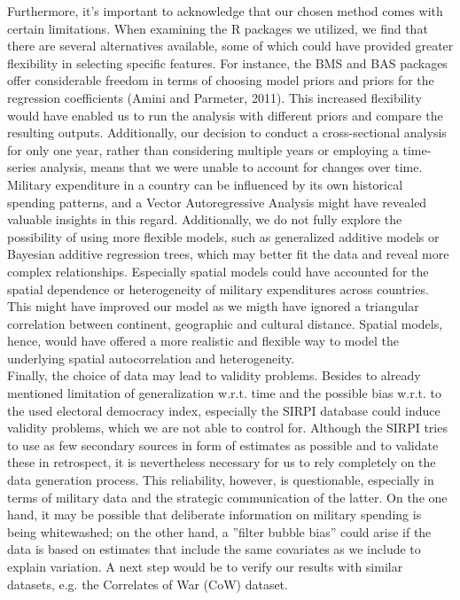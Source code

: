 \documentclass[12pt,a4paper]{article}
\begin{document}
Furthermore, it's important to acknowledge that our chosen method comes with certain limitations. When examining the R packages we utilized, we find that there are several alternatives available, some of which could have provided greater flexibility in selecting specific features. For instance, the BMS and BAS packages offer considerable freedom in terms of choosing model priors and priors for the regression coefficients (Amini and Parmeter, 2011). This increased flexibility would have enabled us to run the analysis with different priors and compare the resulting outputs. Additionally, our decision to conduct a cross-sectional analysis for only one year, rather than considering multiple years or employing a time-series analysis, means that we were unable to account for changes over time. Military expenditure in a country can be influenced by its own historical spending patterns, and a Vector Autoregressive Analysis might have revealed valuable insights in this regard. Additionally, we do not fully explore the possibility of using more flexible models, such as generalized additive models or Bayesian additive regression trees, which may better fit the data and reveal more complex relationships. Especially spatial models could have accounted for the spatial dependence or heterogeneity of military expenditures across countries. This might have improved our model as we migth have ignored a triangular correlation between continent, geographic and cultural distance. Spatial models, hence, would have offered a more realistic and flexible way to model the underlying spatial autocorrelation and heterogeneity.\\

Finally, the choice of data may lead to validity problems. Besides to already mentioned limitation of generalization w.r.t. time and the possible bias w.r.t. to the used electoral democracy index, especially the SIRPI database could induce validity problems, which we are not able to control for. Although the SIRPI tries to use as few secondary sources in form of estimates as possible and to validate these in retrospect, it is nevertheless necessary for us to rely completely on the data generation process. This reliability, however, is questionable, especially in terms of military data and the strategic communication of the latter. On the one hand, it may be possible that deliberate information on military spending is being whitewashed; on the other hand, a ''filter bubble bias'' could arise if the data is based on estimates that include the same covariates as we include to explain variation. A next step would be to verify our results with similar datasets, e.g. the Correlates of War (CoW) dataset.
\end{document}
